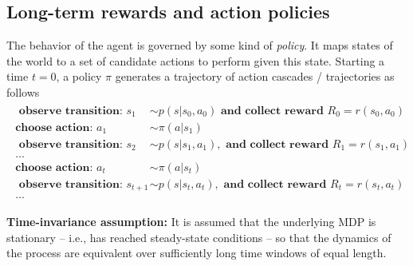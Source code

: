 \documentclass[10pt,letterpaper]{article}
\begin{document}
\subsection{Long-term rewards and action policies}
The behavior of the agent is governed by some kind of \textit{policy}.
It maps states of the world to
a set of candidate actions to perform given this state. Starting a time $t=0$,
a policy $\pi$ generates a trajectory of action cascades / trajectories as follows
\begin{eqnarray*}
  \begin{split}
    \textbf{ observe transition: }s_1 &\sim p(s|s_0,a_0)\textbf{ and collect reward }R_0 = r(s_0, a_0)\\
    \textbf{choose action: }a_1 &\sim \pi(a|s_1)\\
    \textbf{ observe transition: }s_2 &\sim p(s|s_1,a_1), \textbf{ and collect reward }R_1 = r(s_1, a_1)\\
    \ldots\\
    \textbf{choose action: }a_{t} &\sim \pi(a|s_{t})\\
    \textbf{ observe transition: }s_{t+1} &\sim p(s|s_{t},a_{t}), \textbf{ and collect reward }R_{t} = r(s_{t}, a_{t})\\
    \ldots
  \end{split}
\end{eqnarray*}

\begin{mdframed}
  \textbf{Time-invariance assumption:} It is assumed that the underlying MDP is stationary -- i.e., has reached steady-state conditions --
  so that the dynamics of the process are equivalent over sufficiently long time windows of equal length.
\end{mdframed}
\end{document}
